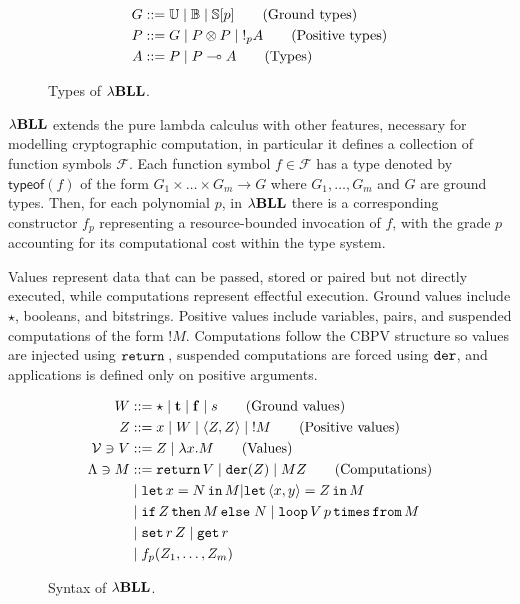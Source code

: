 \begin{figure}[htpb]
  \centering
  \begin{align*}
    G &::= \mathbb{U} \mid \mathbb{B} \mid \mathbb{S}[p] \tag{Ground types} \\
    P &::= G \mid P \otimes P \mid \mathord{!}_p A \tag{Positive types} \\
    A &::= P \mid P \multimap A \tag{Types}
  \end{align*}
  \caption{Types of ${\lambda}\mathbf{BLL}$.}
  \label{fig:types}
\end{figure}

${\lambda}\mathbf{BLL}$ extends the pure lambda calculus with other features, necessary for modelling cryptographic computation, in particular it defines a collection of function symbols $\mathcal{F}$. Each function symbol $f \in \mathcal{F}$ has a type denoted by $\mathsf{typeof}(f)$ of the form $G_1 \times \dots \times G_m \to G$ where $G_1, \dots, G_m$ and $G$ are ground types. Then, for each polynomial $p$, in ${\lambda}\mathbf{BLL}$ there is a corresponding constructor $f_p$ representing a resource-bounded invocation of $f$, with the grade $p$ accounting for its computational cost within the type system.

Values represent data that can be passed, stored or paired but not directly executed, while computations represent effectful execution. Ground values include $\star$, booleans, and bitstrings. Positive values include variables, pairs, and suspended computations of the form $!M$. Computations follow the CBPV structure so values are injected using $\mathtt{return}\,$, suspended computations are forced using $\mathtt{der}$, and applications is defined only on positive arguments.

\begin{figure}[htpb]
  \centering
  \begin{align*}
    W &::= \star \mid \mathbf{t} \mid \mathbf{f} \mid s \tag{Ground values} \\
    Z &::= x \mid W\mid \langle Z,Z \rangle \mid \mathord{!} M \tag{Positive values} \\
    \mathcal{V} \ni V &::= Z \mid \lambda x.M \tag{Values} \\
    \Lambda \ni M &::=  \mathtt{return}\, V \mid  \mathtt{der} (Z) \mid  MZ \tag{Computations} \\
    &\mid \mathtt{let}\,x=N\,\mathtt{in}\, M | \mathtt{let}\,\langle x,y \rangle=Z\,\mathtt{in}\, M \\
    &\mid \mathtt{if}\,Z\,\mathtt{then}\, M\,\mathtt{else}\; N \mid \mathtt{loop}\,V\,p\,\mathtt{times \, from}\, M \\
    &\mid \mathtt{set}\,r\, Z \mid \mathtt{get}\, r \\
    &\mid f_p(Z_1, \dots, Z_m) \\
  \end{align*}
  \caption{Syntax of ${\lambda}\mathbf{BLL}$.}
  \label{fig:syntax}
\end{figure}

